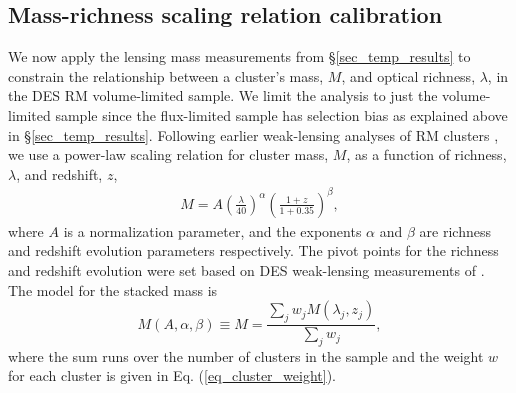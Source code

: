 \subsection{Mass-richness \ML{} scaling relation calibration}\label{sec_ML_scaling}

We now apply the lensing mass measurements from \S\ref{sec_temp_results} to constrain the relationship between a cluster's mass, $M$, and optical richness, $\lambda$, in the DES RM \whichyear{} volume-limited sample. 
We limit the analysis to just the volume-limited sample since the flux-limited sample has selection bias as explained above in \S\ref{sec_temp_results}.
Following earlier weak-lensing analyses of RM clusters \citep{simet18, melchoir17, mcclintock18}, we use a power-law scaling relation for cluster mass, $M$, as a function of richness, $\lambda$, and redshift, $z$,
\begin{eqnarray}
M = A \left(\frac{\lambda}{40}\right)^{\alpha} \left(\frac{1+z}{1+0.35}\right)^{\beta},
\label{eq_ML}
 \end{eqnarray}
 where $A$ is a normalization parameter, and the exponents $\alpha$ and $\beta$ are richness and redshift evolution parameters respectively. 
The pivot points for the richness and redshift evolution were set based on DES weak-lensing measurements of .
The model for the stacked mass is 
\begin{equation}
M(A, \alpha, \beta) \equiv M = \frac{\sum_j w_j M(\lambda_{j}, z_{j})}{\sum_j w_j}, 
\label{eq_model_ML}
\end{equation}
where the sum runs over the number of clusters in the sample and the weight $w$ for each cluster is given in Eq. (\ref{eq_cluster_weight}).


